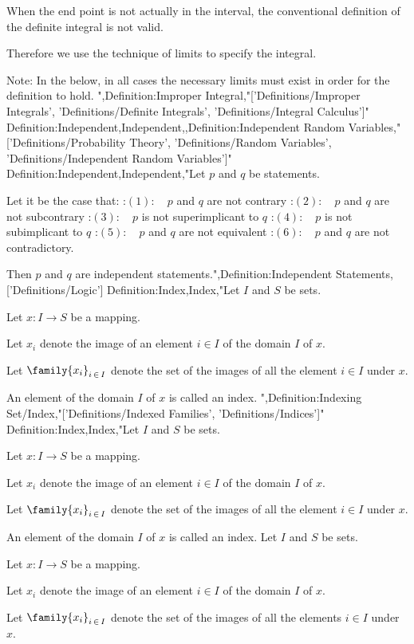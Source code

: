 When the end point is not actually in the interval, the conventional definition of the definite integral is not valid.

Therefore we use the technique of limits to specify the integral.


Note: In the below, in all cases the necessary limits must exist in order for the definition to hold.
",Definition:Improper Integral,"['Definitions/Improper Integrals', 'Definitions/Definite Integrals', 'Definitions/Integral Calculus']"
Definition:Independent,Independent,,Definition:Independent Random Variables,"['Definitions/Probability Theory', 'Definitions/Random Variables', 'Definitions/Independent Random Variables']"
Definition:Independent,Independent,"Let $p$ and $q$ be statements.

Let it be the case that:
:$(1): \quad p$ and $q$ are not contrary
:$(2): \quad p$ and $q$ are not subcontrary
:$(3): \quad p$ is not superimplicant to $q$
:$(4): \quad p$ is not subimplicant to $q$
:$(5): \quad p$ and $q$ are not equivalent
:$(6): \quad p$ and $q$ are not contradictory.


Then $p$ and $q$ are independent statements.",Definition:Independent Statements,['Definitions/Logic']
Definition:Index,Index,"Let $I$ and $S$ be sets.

Let $x: I \to S$ be a mapping.

Let $x_i$ denote the image of an element $i \in I$ of the domain $I$ of $x$.

Let $\family {x_i}_{i \mathop \in I}$ denote the set of the images of all the element $i \in I$ under $x$.


An element of the domain $I$ of $x$ is called an index.
",Definition:Indexing Set/Index,"['Definitions/Indexed Families', 'Definitions/Indices']"
Definition:Index,Index,"Let $I$ and $S$ be sets.

Let $x: I \to S$ be a mapping.

Let $x_i$ denote the image of an element $i \in I$ of the domain $I$ of $x$.

Let $\family {x_i}_{i \mathop \in I}$ denote the set of the images of all the element $i \in I$ under $x$.


An element of the domain $I$ of $x$ is called an index.
Let $I$ and $S$ be sets.

Let $x: I \to S$ be a mapping.

Let $x_i$ denote the image of an element $i \in I$ of the domain $I$ of $x$.

Let $\family {x_i}_{i \mathop \in I}$ denote the set of the images of all the elements $i \in I$ under $x$.


